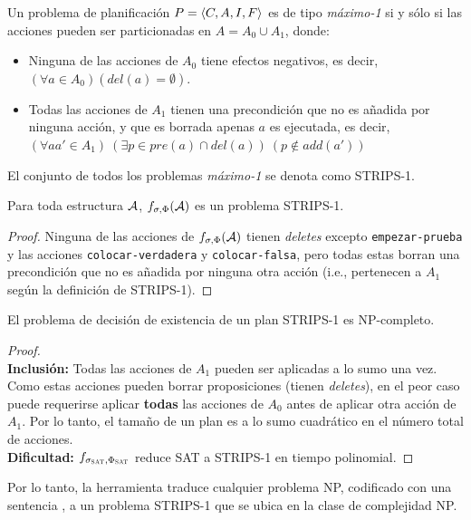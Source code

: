 \begin{definition}
Un problema de planificación $P = \langle C, A, I, F \rangle$ es de tipo
\textit{máximo-1} si y sólo si las acciones pueden ser particionadas en $A =
A_0 \cup A_1$, donde:
\begin{itemize}
\item Ninguna de las acciones de $A_0$ tiene efectos negativos, es decir,
$(\forall a \in A_0) (del(a) = \emptyset)$.
\item Todas las acciones de $A_1$ tienen una precondición que no es añadida por
ninguna acción, y que es borrada apenas $a$ es ejecutada, es decir, 
$(\forall aa' \in A_1)\ (\exists p \in pre(a) \cap del(a))\ (p \not\in add(a'))$
\end{itemize}

El conjunto de todos los problemas \textit{máximo-1} se denota como STRIPS-1.
\end{definition}

\begin{theorem}
Para toda estructura $\mathcal{A}$, $f_{\sigma, \Phi}(\mathcal{A})$ es un problema STRIPS-1.
\end{theorem}
\begin{proof}
Ninguna de las acciones de $f_{\sigma, \Phi}(\mathcal{A})$ tienen \textit{deletes} excepto
\texttt{empezar-prueba} y las acciones \texttt{colocar-verdadera} y
\texttt{colocar-falsa}, pero todas estas borran una precondición que no es
añadida por ninguna otra acción (i.e., pertenecen a $A_1$ según la definición
de STRIPS-1).
\end{proof}

\begin{theorem}
El problema de decisión de existencia de un plan STRIPS-1 es NP-completo.
\end{theorem}
\begin{proof}
\ \\ \textbf{Inclusión:} Todas las acciones de $A_1$ pueden ser aplicadas a lo
sumo una vez. Como estas acciones pueden borrar proposiciones (tienen
\textit{deletes}), en el peor caso puede requerirse aplicar \textbf{todas} las
acciones de $A_0$ antes de aplicar otra acción de $A_1$. Por lo tanto, el
tamaño de un plan es a lo sumo cuadrático en el número total de acciones.
\\ \textbf{Dificultad:} $f_{\sigma_{\textsc{SAT}}, \Phi_{\textsc{SAT}}}$ reduce SAT a STRIPS-1 en
tiempo polinomial.
\end{proof}

Por lo tanto, la herramienta traduce cualquier problema NP, codificado con una
sentencia \SOE, a un problema STRIPS-1 que se ubica en la clase de complejidad
NP.

